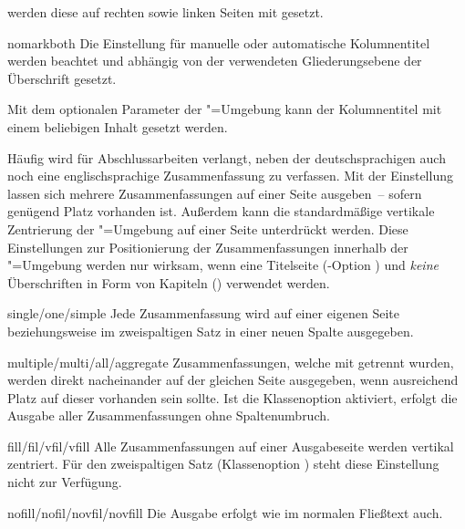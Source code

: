 \begin{Declaration*}{}
\begin{Declaration*}{}
\begin{Declaration*}{}
\begin{Declaration}[%
  v2.02!\Option{abstract=multiple}:ersetzt \Option{abstract=double};%
  v2.02!\Option{abstract=tocleveldown};%
  v2.02!\Option{abstract=markboth};%
  v2.04!\Option{abstract=tocmultiple}%
]{}
\begin{values}{}
  werden diese auf rechten sowie linken Seiten mit  gesetzt.
\item[nomarkboth]
  Die Einstellung für manuelle oder automatische Kolumnentitel werden beachtet 
  und abhängig von der verwendeten Gliederungsebene der Überschrift gesetzt.
\end{values}
%
Mit dem optionalen Parameter  der 
"=Umgebung kann der Kolumnentitel mit einem beliebigen 
Inhalt gesetzt werden.

Häufig wird für Abschlussarbeiten verlangt, neben der deutschsprachigen auch 
noch eine englischsprachige Zusammenfassung zu verfassen. Mit der Einstellung 
 lassen sich mehrere Zusammenfassungen auf einer 
Seite ausgeben~-- sofern genügend Platz vorhanden ist. Außerdem kann die 
standardmäßige vertikale Zentrierung der "=Umgebung 
auf einer Seite unterdrückt werden. Diese Einstellungen zur Positionierung der 
Zusammenfassungen innerhalb der "=Umgebung werden nur 
wirksam, wenn eine Titelseite (\KOMAScript-Option ) und 
\emph{keine} Überschriften in Form von Kapiteln () 
verwendet werden.
%
\begin{values}{}
\item[single/one/simple]
  Jede Zusammenfassung wird auf einer eigenen Seite
  beziehungsweise im zweispaltigen Satz in einer neuen Spalte ausgegeben.
\item[multiple/multi/all/aggregate]
  Zusammenfassungen, welche mit  getrennt wurden, werden 
  direkt nacheinander auf der gleichen Seite ausgegeben, wenn ausreichend Platz 
  auf dieser vorhanden sein sollte. Ist die Klassenoption  
  aktiviert, erfolgt die Ausgabe aller Zusammenfassungen ohne Spaltenumbruch.
\item[fill/fil/vfil/vfill]
  Alle Zusammenfassungen auf einer Ausgabeseite werden vertikal zentriert. Für 
  den zweispaltigen Satz (Klassenoption ) steht diese 
  Einstellung nicht zur Verfügung.
\item[nofill/nofil/novfil/novfill]
  Die Ausgabe erfolgt wie im normalen Fließtext auch.
\end{values}
\end{Declaration}


\end{Declaration*}
\end{Declaration*}
\end{Declaration*}
